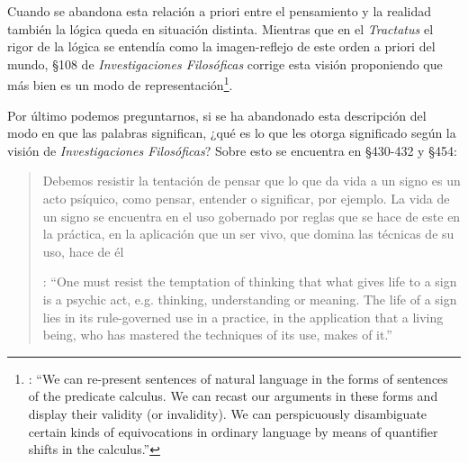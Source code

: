Cuando se abandona esta relación a priori entre el pensamiento y la realidad también la lógica queda en situación distinta. Mientras que en el \emph{Tractatus} el rigor de la lógica se entendía como la imagen-reflejo de este orden a priori del mundo, \S108 de \emph{Investigaciones Filosóficas} corrige esta visión proponiendo que más bien es un modo de representación\footnote{\cite[242]{bakerhacker2009understanding}: \enquote{We can re-present sentences of natural language in the forms of sentences of the predicate calculus. We can recast our arguments in these forms and display their validity (or invalidity). We can perspicuously disambiguate certain kinds of equivocations in ordinary language by means of quantifier shifts in the calculus.}}.

Por último podemos preguntarnos, si se ha abandonado esta descripción del modo en que las palabras significan, ¿qué es lo que les otorga significado según la visión de \emph{Investigaciones Filosóficas}? Sobre esto se encuentra en \S430-432 y \S454: \blockquote[{\cite[4]{hacker2000mind}}: \enquote{One must resist the temptation of thinking that what gives life to a sign is a psychic act, e.g. thinking, understanding or meaning. The life of a sign lies in its rule-governed use in a practice, in the application that a living being, who has mastered the techniques of its use, makes of it.}]{Debemos resistir la tentación de pensar que lo que da vida a un signo es un acto psíquico, como pensar, entender o significar, por ejemplo. La vida de un signo se encuentra en el uso gobernado por reglas que se hace de este en la práctica, en la aplicación que un ser vivo, que domina las técnicas de su uso, hace de él}.

